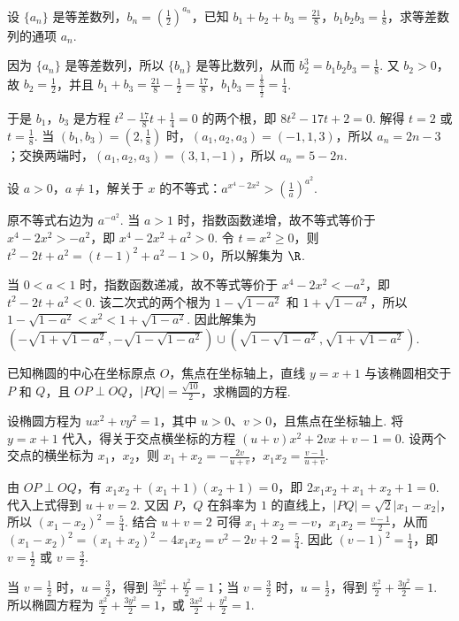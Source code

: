 \documentclass[UTF8,a4paper,oneside,11pt]{ctexbook}
\begin{document}
\begin{problem}
设 \(\{a_{n}\}\) 是等差数列，\(b_{n}=\left(\frac{1}{2}\right)^{a_{n}}\)，已知 \(b_{1}+b_{2}+b_{3}=\frac{21}{8}\)，\(b_{1}b_{2}b_{3}=\frac{1}{8}\)，求等差数列的通项 \(a_{n}\).
\end{problem}

\begin{solution}
因为 \(\{a_n\}\) 是等差数列，所以 \(\{b_n\}\) 是等比数列，从而 \(b_2^3=b_1b_2b_3=\frac18\). 又 \(b_2>0\)，故 \(b_2=\frac12\)，并且 \(b_1+b_3=\frac{21}{8}-\frac12=\frac{17}{8}\)，\(b_1b_3=\frac{\frac{1}{8}}{\frac{1}{2}}=\frac14\).

于是 \(b_1\)，\(b_3\) 是方程 \(t^2-\frac{17}{8}t+\frac14=0\) 的两个根，即 \(8t^2-17t+2=0\). 解得 \(t=2\) 或 \(t=\frac18\). 当 \((b_1,b_3)=(2,\frac18)\) 时，\((a_1,a_2,a_3)=(-1,1,3)\)，所以 \(a_n=2n-3\)；交换两端时，\((a_1,a_2,a_3)=(3,1,-1)\)，所以 \(a_n=5-2n\).
\end{solution}

\begin{problem}
设 \(a > 0\)，\(a \neq 1\)，解关于 \(x\) 的不等式：\(a^{x^{4} - 2x^{2}} > \left(\frac{1}{a}\right)^{a^{2}}\).
\end{problem}

\begin{solution}
原不等式右边为 \(a^{-a^2}\). 当 \(a>1\) 时，指数函数递增，故不等式等价于 \(x^4-2x^2>-a^2\)，即 \(x^4-2x^2+a^2>0\). 令 \(t=x^2\geq0\)，则 \(t^2-2t+a^2=(t-1)^2+a^2-1>0\)，所以解集为 \(\R\).

当 \(0<a<1\) 时，指数函数递减，故不等式等价于 \(x^4-2x^2<-a^2\)，即 \(t^2-2t+a^2<0\). 该二次式的两个根为 \(1-\sqrt{1-a^2}\) 和 \(1+\sqrt{1-a^2}\)，所以 \(1-\sqrt{1-a^2}<x^2<1+\sqrt{1-a^2}\). 因此解集为
\(\left(-\sqrt{1+\sqrt{1-a^2}},-\sqrt{1-\sqrt{1-a^2}}\right)\cup\left(\sqrt{1-\sqrt{1-a^2}},\sqrt{1+\sqrt{1-a^2}}\right)\).
\end{solution}

\begin{problem}
已知椭圆的中心在坐标原点 \(O\)，焦点在坐标轴上，直线 \(y = x + 1\) 与该椭圆相交于 \(P\) 和 \(Q\)，且 \(OP \perp OQ\)，\(|PQ| = \frac{\sqrt{10}}{2}\)，求椭圆的方程.
\end{problem}

\begin{solution}
设椭圆方程为 \(ux^2+vy^2=1\)，其中 \(u>0\)、\(v>0\)，且焦点在坐标轴上. 将 \(y=x+1\) 代入，得关于交点横坐标的方程 \((u+v)x^2+2vx+v-1=0\). 设两个交点的横坐标为 \(x_1\)，\(x_2\)，则
\(x_1+x_2=-\frac{2v}{u+v}\)，\(x_1x_2=\frac{v-1}{u+v}\).

由 \(OP\perp OQ\)，有 \(x_1x_2+(x_1+1)(x_2+1)=0\)，即 \(2x_1x_2+x_1+x_2+1=0\). 代入上式得到 \(u+v=2\). 又因 \(P\)，\(Q\) 在斜率为 \(1\) 的直线上，\(|PQ|=\sqrt2|x_1-x_2|\)，所以 \((x_1-x_2)^2=\frac54\). 结合 \(u+v=2\) 可得 \(x_1+x_2=-v\)，\(x_1x_2=\frac{v-1}{2}\)，从而 \((x_1-x_2)^2=(x_1+x_2)^2-4x_1x_2=v^2-2v+2=\frac54\). 因此 \((v-1)^2=\frac14\)，即 \(v=\frac12\) 或 \(v=\frac32\).

当 \(v=\frac12\) 时，\(u=\frac32\)，得到 \(\frac{3x^2}{2}+\frac{y^2}{2}=1\)；当 \(v=\frac32\) 时，\(u=\frac12\)，得到 \(\frac{x^2}{2}+\frac{3y^2}{2}=1\). 所以椭圆方程为 \(\frac{x^2}{2}+\frac{3y^2}{2}=1\)，或 \(\frac{3x^2}{2}+\frac{y^2}{2}=1\).
\end{solution}

\end{document}
